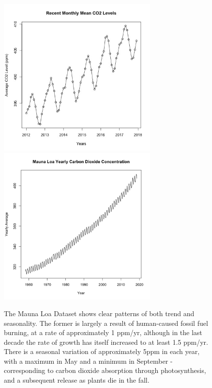 \documentclass{article}
\begin{document}
\begin{figure}[h]
\includegraphics[width = 8cm, height = 8cm]{recent.jpg}
\includegraphics[width = 8cm, height = 8cm]{entire.png}
\caption{The Mauna Loa Dataset shows clear patterns of both trend and seasonality. The former is largely a result of human-caused fossil fuel burning, at a rate of approximately 1 ppm/yr, although in the last decade the rate of growth has itself increased to at least 1.5 ppm/yr. There is a seasonal variation of approximately 5ppm in each year, with a maximum in May and a minimum in September - corresponding to carbon dioxide absorption through photosynthesis, and a subsequent release as plants die in the fall. }
\end{figure}
\end{document}
